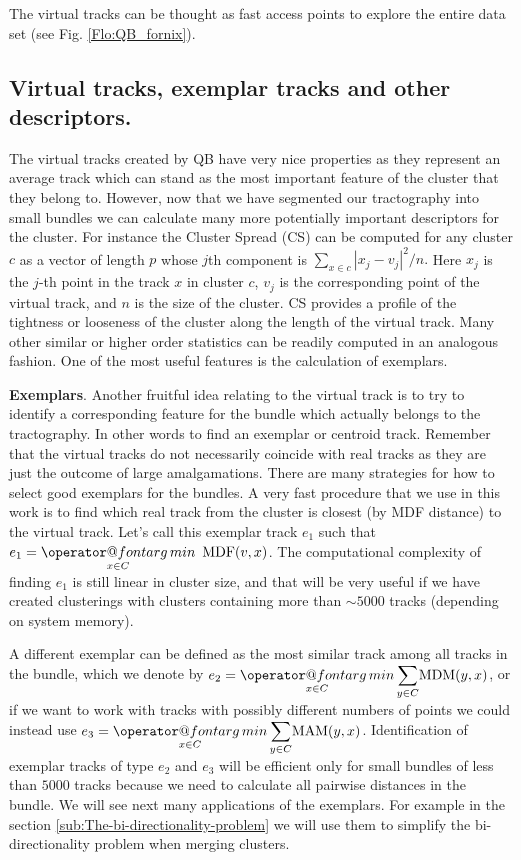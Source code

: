 \documentclass[preprint,authoryear,a4paper,10pt,onecolumn]{elsarticle}
\makeatletter
\def\argmin{\mathop{\operator@font arg\,min}}
\makeatother
\begin{document}
The virtual tracks can be thought as fast access points to explore the
entire data set (see Fig. \ref{Flo:QB_fornix}).


\subsection{Virtual tracks, exemplar tracks and other descriptors.}

The virtual tracks created by QB have very nice properties as they
represent an average track which can stand as the most important feature
of the cluster that they belong to. However, now that we have segmented
our tractography into small bundles we can calculate many more
potentially important descriptors for the cluster. For instance the
Cluster Spread (CS) can be computed for any cluster $c$ as a vector of
length $p$ whose $j$th component is $\sum_{x\in c}|x_{j}-v_{j}|^{2}/n.$
Here $x_{j}$ is the $j$-th point in the track $x$ in cluster $c$,
$v_{j}$ is the corresponding point of the virtual track, and $n$ is the
size of the cluster. CS provides a profile of the tightness or looseness
of the cluster along the length of the virtual track. Many other similar
or higher order statistics can be readily computed in an analogous
fashion. One of the most useful features is the calculation of
exemplars.

\textbf{Exemplars}. Another fruitful idea relating to the virtual track
is to try to identify a corresponding feature for the bundle which
actually belongs to the tractography. In other words to find an exemplar
or centroid track. Remember that the virtual tracks do not necessarily
coincide with real tracks as they are just the outcome of large
amalgamations. There are many strategies for how to select good
exemplars for the bundles. A very fast procedure that we use in this
work is to find which real track from the cluster is closest (by MDF
distance) to the virtual track. Let's call this exemplar track $e_{1}$
such that $e_{1}={\displaystyle \argmin_{x\in C}}\textrm{\,\ MDF}(v,x)$.
The computational complexity of finding $e_{1}$ is still linear in
cluster size, and that will be very useful if we have created
clusterings with clusters containing more than $\sim5000$ tracks
(depending on system memory).

A different exemplar can be defined as the most similar track among all
tracks in the bundle, which we denote by $e_{2}={\displaystyle
  \argmin_{x\in C}}\,{\displaystyle \sum_{y\in C}}\mathrm{MDM(}y,x)$, or
if we want to work with tracks with possibly different numbers of points
we could instead use $e_{3}={\displaystyle \argmin_{x\in
    C}}\,{\displaystyle \sum_{y\in C}}\mathrm{MAM(}y,x)$.
Identification of exemplar tracks of type $e_{2}$ and $e_{3}$ will be
efficient only for small bundles of less than $5000$ tracks because we
need to calculate all pairwise distances in the bundle. We will see next
many applications of the exemplars. For example in the section
\ref{sub:The-bi-directionality-problem} we will use them to simplify the
bi-directionality problem when merging clusters.
\end{document}
